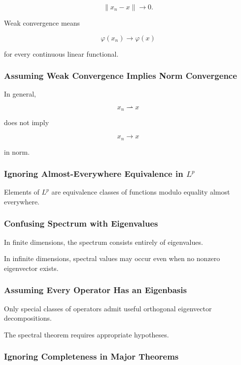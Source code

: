 \[
\|x_n-x\|\to0.
\]

Weak convergence means

\[
\varphi(x_n)\to\varphi(x)
\]

for every continuous linear functional.

\subsubsection{Assuming Weak Convergence Implies Norm Convergence}

In general,

\[
x_n\rightharpoonup x
\]

does not imply

\[
x_n\to x
\]

in norm.

\subsubsection{Ignoring Almost-Everywhere Equivalence in \(L^p\)}

Elements of \(L^p\) are equivalence classes of functions modulo equality
almost everywhere.

\subsubsection{Confusing Spectrum with Eigenvalues}

In finite dimensions, the spectrum consists entirely of eigenvalues.

In infinite dimensions, spectral values may occur even when no nonzero
eigenvector exists.

\subsubsection{Assuming Every Operator Has an Eigenbasis}

Only special classes of operators admit useful orthogonal eigenvector
decompositions.

The spectral theorem requires appropriate hypotheses.

\subsubsection{Ignoring Completeness in Major Theorems}

